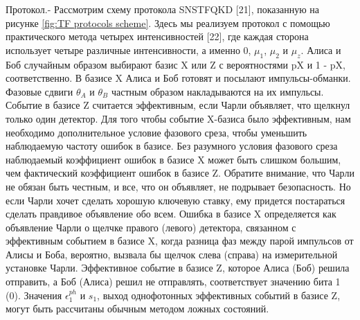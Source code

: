 Протокол.- Рассмотрим схему протокола SNSTFQKD [21], показанную на рисунке \ref{fig:TF protocols scheme}. Здесь мы реализуем протокол с помощью практического метода четырех интенсивностей [22], где каждая сторона использует четыре различные интенсивности, а именно 0, $\mu_1$, $\mu_2$ и $\mu_z$. Алиса и Боб случайным образом выбирают базис X или Z с вероятностями pX и 1 - pX, соответственно. В базисе X Алиса и Боб готовят и посылают импульсы-обманки. Фазовые сдвиги $\theta_A$ и $\theta_B$ частным образом накладываются на их импульсы. Событие в базисе Z считается эффективным, если Чарли объявляет, что щелкнул только один детектор. Для того чтобы событие X-базиса было эффективным, нам необходимо дополнительное условие фазового среза, чтобы уменьшить наблюдаемую частоту ошибок в базисе. Без разумного условия фазового среза наблюдаемый коэффициент ошибок в базисе X может быть слишком большим, чем фактический коэффициент ошибок в базисе Z. Обратите внимание, что Чарли не обязан быть честным, и все, что он объявляет, не подрывает безопасность. Но если Чарли хочет сделать хорошую ключевую ставку, ему придется постараться сделать правдивое объявление обо всем. Ошибка в базисе X определяется как объявление Чарли о щелчке правого (левого) детектора, связанном с эффективным событием в базисе X, когда разница фаз между парой импульсов от Алисы и Боба, вероятно, вызвала бы щелчок слева (справа) на измерительной установке Чарли. Эффективное событие в базисе Z, которое Алиса (Боб) решила отправить, а Боб (Алиса) решил не отправлять, соответствует значению бита 1 (0). Значения $\epsilon_1^{ph}$ и $s_1$, выход однофотонных эффективных событий в базисе Z, могут быть рассчитаны обычным методом ложных состояний.
